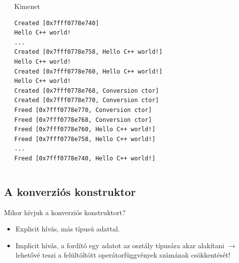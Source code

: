 \documentclass[usenames,dvipsnames,aspectratio=169]{beamer}
\begin{document}
\begin{frame}[fragile]
    \begin{columns}[T]
            \begin{exampleblock}{}
                \vspace{-.2cm}
                \scriptsize
                
                
                \vspace{-.2cm}
            \end{exampleblock}
            \begin{block}{Kimenet}
                \vspace{-.4cm}
                \scriptsize
                \begin{verbatim}
Created [0x7fff0778e740]
Hello C++ world!
...
Created [0x7fff0778e758, Hello C++ world!]
Hello C++ world!
Created [0x7fff0778e760, Hello C++ world!]
Hello C++ world!
Created [0x7fff0778e768, Conversion ctor]
Created [0x7fff0778e770, Conversion ctor]
Freed [0x7fff0778e770, Conversion ctor]
Freed [0x7fff0778e768, Conversion ctor]
Freed [0x7fff0778e760, Hello C++ world!]
Freed [0x7fff0778e758, Hello C++ world!]
...
Freed [0x7fff0778e740, Hello C++ world!]
\end{verbatim}             
                \vspace{-.4cm}
            \end{block}
    \end{columns}
\end{frame}

\subsection{A konverziós konstruktor}

\begin{frame}
    Mikor hívjuk a konverziós konstruktort?
    \begin{itemize}
        \item Explicit hívás, más típusú adattal.
        \item Implicit hívás, a fordító egy adatot az osztály típusára akar alakítani $\to$ lehetővé teszi a felültöltött operátorfüggvények számának csökkentését!
    \end{itemize}
\end{frame}
\end{document}
